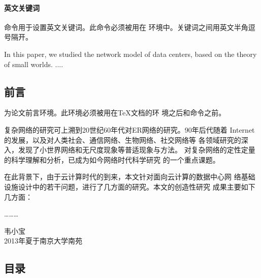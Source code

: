 \paragraph{英文关键词}

命令用于设置英文关键词。此命令必须被用在
环境中。关键词之间用英文半角逗号隔开。
\begin{tex}
\begin{englishabstract}
In this paper, we studied the network model of data centers,
based on the theory of small worlds. ....
\end{englishabstract}
\end{tex}


\subsection{前言}

为论文前言环境。此环境必须被用在{\TeX}文档的环
境之后和命令之前。
\begin{tex}
\begin{preface}
 复杂网络的研究可上溯到20世纪60年代对ER网络的研究。90年后代随着
 Internet的发展，以及对人类社会、通信网络、生物网络、社交网络等
 各领域研究的深入，发现了小世界网络和无尺度现象等普适现象与方法。
 对复杂网络的定性定量的科学理解和分析，已成为如今网络时代科学研究
 的一个重点课题。

 在此背景下，由于云计算时代的到来，本文针对面向云计算的数据中心网
 络基础设施设计中的若干问题，进行了几方面的研究。本文的创造性研究
 成果主要如下几方面：

 ………

 \vspace{1cm}
 \begin{flushright}
  韦小宝\\
  2013年夏于南京大学南苑
 \end{flushright}
\end{preface}
\end{tex}


\subsection{目录}

